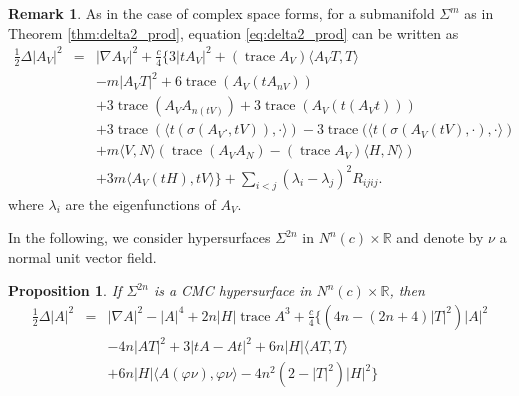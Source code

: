 \documentclass[11pt]{amsart}
\theoremstyle{plain}
\newtheorem{proposition}  [theorem]  {Proposition}
\theoremstyle{definition}
\newtheorem{remark}       [theorem]  {Remark}
\DeclareMathOperator{\trace}{trace} \DeclareMathOperator{\di}{div}
\numberwithin{equation}{section}
\begin{document}
\begin{remark} As in the case of complex space forms, for a submanifold $\Sigma^m$ as in Theorem \ref{thm:delta2_prod}, equation \eqref{eq:delta2_prod} can be written as
\begin{eqnarray}\label{eq:delta1_prod}
\frac{1}{2}\Delta|A_V|^2&=&|\nabla A_V|^2+\frac{c}{4}\{3|tA_V|^2+(\trace A_V)\langle A_VT,T\rangle\\\nonumber &&-m|A_VT|^2+6\trace(A_V(tA_{nV}))\\\nonumber&&+3\trace(A_VA_{n(tV)})+3\trace(A_V(t(A_Vt)))\\\nonumber &&+3\trace(\langle t(\sigma(A_V\cdot,tV)),\cdot\rangle)-3\trace(\langle t(\sigma(A_V(tV),\cdot),\cdot\rangle)\\\nonumber &&+m\langle V,N\rangle(\trace(A_VA_N)-(\trace A_V)\langle H,N\rangle)\\\nonumber &&+3m\langle A_V(tH),tV\rangle\}+\sum_{i<j}(\lambda_i-\lambda_j)^2R_{ijij}.
\end{eqnarray}
where $\lambda_i$ are the eigenfunctions of $A_V$.
\end{remark}

In the following, we consider hypersurfaces $\Sigma^{2n}$ in $N^n(c)\times\mathbb{R}$ and denote by $\nu$ a normal unit vector field.

\begin{proposition}\label{hyper} If $\Sigma^{2n}$ is a CMC hypersurface in $N^n(c)\times\mathbb{R}$, then
\begin{eqnarray}\label{eq:hyper2_prod}
\frac{1}{2}\Delta|A|^2&=&|\nabla A|^2-|A|^4+2n|H|\trace A^3+\frac{c}{4}\{(4n-(2n+4)|T|^2)|A|^2\\\nonumber &&-4n|AT|^2+3|tA-At|^2+6n|H|\langle AT,T\rangle\\\nonumber&&+6n|H|\langle A(\varphi\nu),\varphi\nu\rangle-4n^2(2-|T|^2)|H|^2\}
\end{eqnarray}

\end{proposition}
\end{document}
